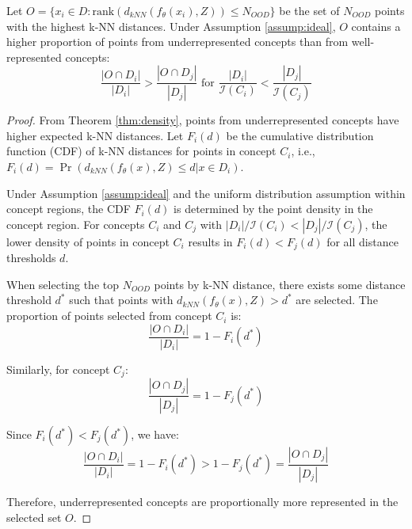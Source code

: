 \begin{theorem}
\label{thm:rank}
Let $O = \{x_i \in D : \text{rank}(d_{kNN}(f_\theta(x_i), Z)) \leq N_{OOD}\}$ be the set of $N_{OOD}$ points with the highest k-NN distances. Under Assumption \ref{assump:ideal}, $O$ contains a higher proportion of points from underrepresented concepts than from well-represented concepts:
\begin{equation}
\frac{|O \cap D_i|}{|D_i|} > \frac{|O \cap D_j|}{|D_j|} \text{ for } \frac{|D_i|}{\mathcal{I}(C_i)} < \frac{|D_j|}{\mathcal{I}(C_j)}
\end{equation}
\end{theorem}

\begin{proof}
From Theorem \ref{thm:density}, points from underrepresented concepts have higher expected k-NN distances. Let $F_i(d)$ be the cumulative distribution function (CDF) of k-NN distances for points in concept $C_i$, i.e., $F_i(d) = \Pr(d_{kNN}(f_\theta(x), Z) \leq d | x \in D_i)$.

\noindent
Under Assumption \ref{assump:ideal} and the uniform distribution assumption within concept regions, the CDF $F_i(d)$ is determined by the point density in the concept region. For concepts $C_i$ and $C_j$ with $|D_i|/\mathcal{I}(C_i) < |D_j|/\mathcal{I}(C_j)$, the lower density of points in concept $C_i$ results in $F_i(d) < F_j(d)$ for all distance thresholds $d$.

\noindent
When selecting the top $N_{OOD}$ points by k-NN distance, there exists some distance threshold $d^*$ such that points with $d_{kNN}(f_\theta(x), Z) > d^*$ are selected. The proportion of points selected from concept $C_i$ is:
\begin{equation}
\frac{|O \cap D_i|}{|D_i|} = 1 - F_i(d^*)
\end{equation}

\noindent
Similarly, for concept $C_j$:
\begin{equation}
\frac{|O \cap D_j|}{|D_j|} = 1 - F_j(d^*)
\end{equation}

\noindent
Since $F_i(d^*) < F_j(d^*)$, we have:
\begin{equation}
\frac{|O \cap D_i|}{|D_i|} = 1 - F_i(d^*) > 1 - F_j(d^*) = \frac{|O \cap D_j|}{|D_j|}
\end{equation}

\noindent
Therefore, underrepresented concepts are proportionally more represented in the selected set $O$.
\end{proof}

